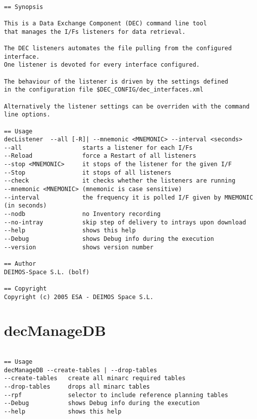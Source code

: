 \documentclass[dec_sum_main.tex]{subfiles}
\begin{document}
\begin{verbatim}

== Synopsis

This is a Data Exchange Component (DEC) command line tool 
that manages the I/Fs listeners for data retrieval.

The DEC listeners automates the file pulling from the configured interface.
One listener is devoted for every interface configured.

The behaviour of the listener is driven by the settings defined
in the configuration file $DEC_CONFIG/dec_interfaces.xml

Alternatively the listener settings can be overriden with the command line options.

== Usage
decListener  --all [-R]| --mnemonic <MNEMONIC> --interval <seconds>
--all                 starts a listener for each I/Fs
--Reload              force a Restart of all listeners
--stop <MNEMONIC>     it stops of the listener for the given I/F
--Stop                it stops of all listeners
--check               it checks whether the listeners are running
--mnemonic <MNEMONIC> (mnemonic is case sensitive)
--interval            the frequency it is polled I/F given by MNEMONIC (in seconds)
--nodb                no Inventory recording
--no-intray           skip step of delivery to intrays upon download
--help                shows this help
--Debug               shows Debug info during the execution
--version             shows version number      

== Author
DEIMOS-Space S.L. (bolf)

== Copyright
Copyright (c) 2005 ESA - DEIMOS Space S.L.

\end{verbatim}

\section{decManageDB}

\begin{verbatim}

== Usage
decManageDB --create-tables | --drop-tables
--create-tables   create all minarc required tables
--drop-tables     drops all minarc tables
--rpf             selector to include reference planning tables
--Debug           shows Debug info during the execution
--help            shows this help


\end{verbatim}

\label{decNotify2Interface}
\end{document}
